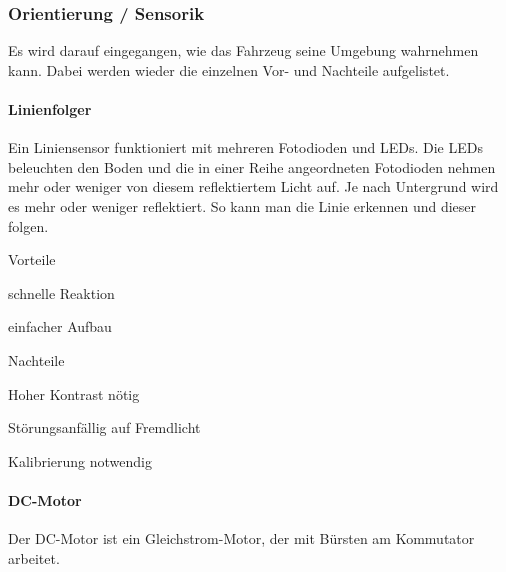 \subsubsection{Orientierung / Sensorik}

Es wird darauf eingegangen, wie das Fahrzeug seine Umgebung wahrnehmen kann. Dabei werden wieder die einzelnen Vor- und Nachteile aufgelistet.

\paragraph{Linienfolger}
Ein Liniensensor funktioniert mit mehreren Fotodioden und LEDs. Die LEDs beleuchten den Boden und die in einer Reihe angeordneten Fotodioden nehmen mehr oder weniger von diesem reflektiertem Licht auf. Je nach Untergrund wird es mehr oder weniger reflektiert. So kann man die Linie erkennen und dieser folgen.
 

\begin{minipage}[t]{0.48\textwidth}
\begin{items}
  \item [Vorteile]
  \item schnelle Reaktion
  \item einfacher Aufbau
\end{items}
\end{minipage}
\hfill
\begin{minipage}[t]{0.48\textwidth}
\begin{items}
  \item [Nachteile]
  \item Hoher Kontrast nötig
  \item Störungsanfällig auf Fremdlicht
  \item Kalibrierung notwendig
\end{items}
\end{minipage}

\paragraph{DC-Motor}

Der DC-Motor ist ein Gleichstrom-Motor, der mit Bürsten am Kommutator arbeitet. 

